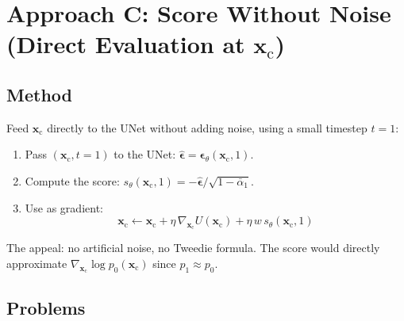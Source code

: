 \documentclass[11pt]{article}
\newcommand{\xb}{\mathbf{x}}
\newcommand{\xc}{\xb_{\mathrm{c}}}  %
\newcommand{\eb}{\boldsymbol{\epsilon}}
\newcommand{\alphabar}{\bar{\alpha}}
\begin{document}
\section{Approach C: Score Without Noise (Direct Evaluation at $\xc$)}

\subsection{Method}

Feed $\xc$ directly to the UNet without adding noise, using a small timestep $t = 1$:
\begin{enumerate}[nosep]
    \item Pass $(\xc, t{=}1)$ to the UNet: $\hat{\eb} = \eb_\theta(\xc, 1)$.
    \item Compute the score: $s_\theta(\xc, 1) = -\hat{\eb} / \sqrt{1-\alphabar_1}$.
    \item Use as gradient:
    \begin{equation}
        \xc \leftarrow \xc + \eta\,\nabla_{\xc} U(\xc)
        + \eta\, w\, s_\theta(\xc, 1)
    \end{equation}
\end{enumerate}

The appeal: no artificial noise, no Tweedie formula. The score would directly approximate
$\nabla_{\xc} \log p_0(\xc)$ since $p_1 \approx p_0$.

\subsection{Problems}
\end{document}
